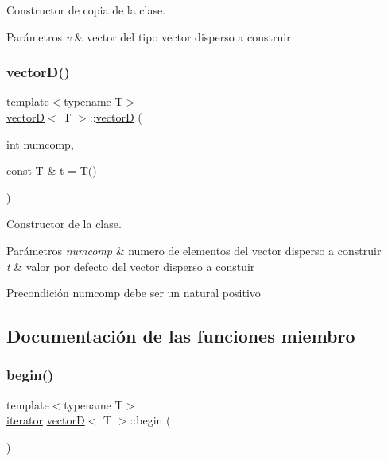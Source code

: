 Constructor de copia de la clase. 


\begin{DoxyParams}{Parámetros}
{\em v} & vector del tipo vector disperso a construir \\
\hline
\end{DoxyParams}
\mbox{\label{classvectorD_ab982195db0c1f79621164da68b3eae16}} 
\subsubsection{\texorpdfstring{vector\+D()}{vectorD()}\hspace{0.1cm}{\footnotesize\ttfamily [2/2]}}
{\footnotesize\ttfamily template$<$typename T$>$ \\
\hyperlink{classvectorD}{vectorD}$<$ T $>$\+::\hyperlink{classvectorD}{vectorD} (\begin{DoxyParamCaption}\item[{int}]{numcomp,  }\item[{const T \&}]{t = {\ttfamily T()} }\end{DoxyParamCaption})}



Constructor de la clase. 


\begin{DoxyParams}{Parámetros}
{\em numcomp} & numero de elementos del vector disperso a construir \\
\hline
{\em t} & valor por defecto del vector disperso a constuir \\
\hline
\end{DoxyParams}
\begin{DoxyPrecond}{Precondición}
numcomp debe ser un natural positivo 
\end{DoxyPrecond}


\subsection{Documentación de las funciones miembro}
\mbox{\label{classvectorD_a8fee40b3302a146d4ab223dc661c3485}} 
\subsubsection{\texorpdfstring{begin()}{begin()}}
{\footnotesize\ttfamily template$<$typename T$>$ \\
\hyperlink{classvectorD_1_1iterator}{iterator} \hyperlink{classvectorD}{vectorD}$<$ T $>$\+::begin (\begin{DoxyParamCaption}{ }\end{DoxyParamCaption})}



